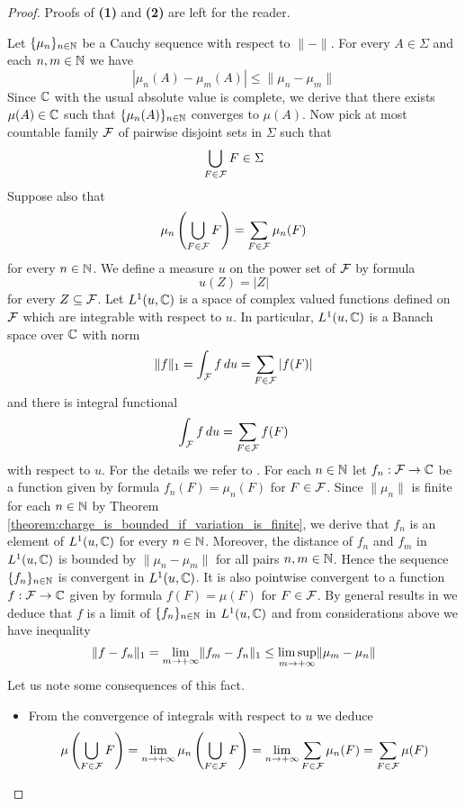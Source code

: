 \begin{proof}
    Proofs of \textbf{(1)} and \textbf{(2)} are left for the reader.

    Let $\{\mu_n\}_{n\in {\mathbb N}}$ be a Cauchy sequence with respect to $\lVert-\rVert$. For every $A \in \Sigma$ and each $n,m\in {\mathbb N}$ we have
    $$|\mu_n(A) - \mu_m(A)|\leq \lVert \mu_n - \mu_m\rVert$$
    Since ${\mathbb C}$ with the usual absolute value is complete, we derive that there exists $\mu(A) \in {\mathbb C}$ such that $\{\mu_n(A)\}_{n\in {\mathbb N}}$ converges to $\mu(A)$. Now pick at most countable family ${\mathcal F}$ of pairwise disjoint sets in $\Sigma$ such that
    $$\bigcup_{F \in {\mathcal F}}F\in \Sigma$$
    Suppose also that
    $$\mu_n\left(\bigcup_{F\in {\mathcal F}}F\right) = \sum_{F\in {\mathcal F}}\mu_n(F)$$
    for every $n \in {\mathbb N}$. We define a measure $u$ on the power set of ${\mathcal F}$ by formula
    $$u(Z) = |Z|$$
    for every $Z \subseteq {\mathcal F}$. Let $L^1(u,{\mathbb C})$ is a space of complex valued functions defined on ${\mathcal F}$ which are integrable with respect to $u$. In particular, $L^1(u,{\mathbb C})$ is a Banach space over ${\mathbb C}$ with norm
    $$\lVert f \rVert_1 = \int_{{\mathcal F}} f\,du = \sum_{F\in {\mathcal F}}|f(F)|$$
    and there is integral functional
    $$\int_{{\mathcal F}}f\,du = \sum_{F\in {\mathcal F}}f(F)$$
    with respect to $u$. For the details we refer to \cite{Integration}. For each $n \in {\mathbb N}$ let $f_n:{\mathcal F}\rightarrow {\mathbb C}$ be a function given by formula $f_n(F) = \mu_n(F)$ for $F \in {\mathcal F}$. Since $\lVert \mu_n\rVert$ is finite for each $n \in {\mathbb N}$ by Theorem \ref{theorem:charge_is_bounded_if_variation_is_finite}, we derive that $f_n$ is an element of $L^1(u,{\mathbb C})$ for every $n \in {\mathbb N}$. Moreover, the distance of $f_n$ and $f_m$ in $L^1(u,{\mathbb C})$ is bounded by $\lVert \mu_n - \mu_m\rVert$ for all pairs $n,m \in {\mathbb N}$. Hence the sequence $\{f_n\}_{n \in {\mathbb N}}$ is convergent in $L^1(u,{\mathbb C})$. It is also pointwise convergent to a function $f:{\mathcal F} \rightarrow {\mathbb C}$ given by formula $f(F) = \mu(F)$ for $F \in {\mathcal F}$. By general results in \cite{Integration} we deduce that $f$ is a limit of $\{f_n\}_{n\in {\mathbb N}}$ in $L^1(u,{\mathbb C})$ and from considerations above we have inequality
    $$\lVert f - f_n\rVert_1 = \lim_{m\rightarrow +\infty}\lVert f_m - f_n\rVert_1 \leq \limsup_{m \rightarrow +\infty}\lVert \mu_m - \mu_n\rVert$$
    Let us note some consequences of this fact.
    \begin{itemize}
        \item From the convergence of integrals with respect to $u$ we deduce
              $$\mu\left(\bigcup_{F\in {\mathcal F}}F\right) = \lim_{n\rightarrow +\infty}\mu_n\left(\bigcup_{F\in {\mathcal F}}F\right) = \lim_{n\rightarrow +\infty}\sum_{F\in {\mathcal F}}\mu_n(F) = \sum_{F\in {\mathcal F}}\mu(F)$$

\end{itemize}
\end{proof}
